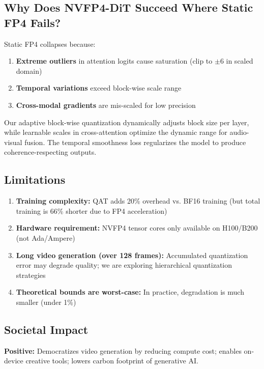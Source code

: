 \documentclass[journal,twoside]{IEEEtran}
\theoremstyle{definition}
\theoremstyle{remark}
\begin{document}
\subsection{Why Does NVFP4-DiT Succeed Where Static FP4 Fails?}

Static FP4 collapses because:
\begin{enumerate}
    \item \textbf{Extreme outliers} in attention logits cause saturation (clip to $\pm6$ in scaled domain)
    \item \textbf{Temporal variations} exceed block-wise scale range
    \item \textbf{Cross-modal gradients} are mis-scaled for low precision
\end{enumerate}

Our adaptive block-wise quantization dynamically adjusts block size per layer, while learnable scales in cross-attention optimize the dynamic range for audio-visual fusion. The temporal smoothness loss regularizes the model to produce coherence-respecting outputs.

\subsection{Limitations}

\begin{enumerate}
    \item \textbf{Training complexity:} QAT adds 20\% overhead vs. BF16 training (but total training is 66\% shorter due to FP4 acceleration)
    \item \textbf{Hardware requirement:} NVFP4 tensor cores only available on H100/B200 (not Ada/Ampere)
    \item \textbf{Long video generation (over 128 frames):} Accumulated quantization error may degrade quality; we are exploring hierarchical quantization strategies
    \item \textbf{Theoretical bounds are worst-case:} In practice, degradation is much smaller (under 1\%)
\end{enumerate}

\subsection{Societal Impact}

\textbf{Positive:} Democratizes video generation by reducing compute cost; enables on-device creative tools; lowers carbon footprint of generative AI.
\end{document}
